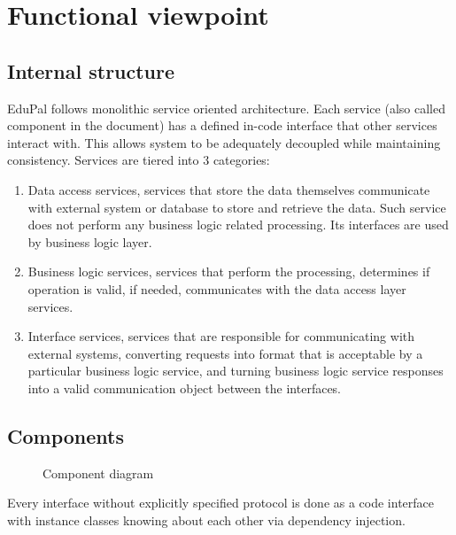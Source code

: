 \section{Functional viewpoint}

\subsection{Internal structure}

EduPal follows monolithic service oriented architecture. Each service (also called component in the document) has a defined in-code interface that other services interact with. This allows system to be adequately decoupled while maintaining consistency. Services are tiered into 3 categories:

\begin{enumerate}
  \item Data access services, services that store the data themselves communicate with external system or database to store and retrieve the data. Such service does not perform any business logic related processing. Its interfaces are used by business logic layer.
  \item Business logic services, services that perform the processing, determines if operation is valid, if needed, communicates with the data access layer services.
  \item Interface services, services that are responsible for communicating with external systems, converting requests into format that is acceptable by a particular business logic service, and turning business logic service responses into a valid communication object between the interfaces.
\end{enumerate}

\subsection{Components}

\begin{figure}[H]
  \label{fig:viewpoint-functional-components}
  \caption{Component diagram}
\end{figure}

Every interface without explicitly specified protocol is done as a code interface with instance classes knowing about each other via dependency injection.

